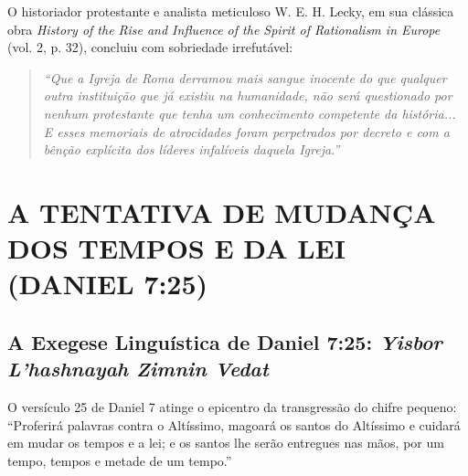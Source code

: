 O historiador protestante e analista meticuloso W. E. H. Lecky, em sua clássica obra \textit{History of the Rise and Influence of the Spirit of Rationalism in Europe} (vol. 2, p. 32), concluiu com sobriedade irrefutável:


\begin{quote}
\itshape ``Que a Igreja de Roma derramou mais sangue inocente do que qualquer outra instituição que já existiu na humanidade, não será questionado por nenhum protestante que tenha um conhecimento competente da história... E esses memoriais de atrocidades foram perpetrados por decreto e com a bênção explícita dos líderes infalíveis daquela Igreja.''
\end{quote}




\section{A TENTATIVA DE MUDANÇA DOS TEMPOS E DA LEI (DANIEL 7:25)}



\subsection{A Exegese Linguística de Daniel 7:25: \textit{Yisbor L’hashnayah Zimnin Vedat}}


O versículo 25 de Daniel 7 atinge o epicentro da transgressão do chifre pequeno: ``Proferirá palavras contra o Altíssimo, magoará os santos do Altíssimo e cuidará em mudar os tempos e a lei; e os santos lhe serão entregues nas mãos, por um tempo, tempos e metade de um tempo.''

